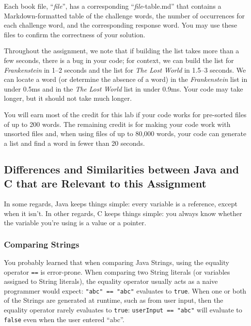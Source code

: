Each book file, ``\textit{file}'', has a corresponding ``\textit{file}-table.md'' that contains a Markdown-formatted table of the challenge words, the number of occurrences for each challenge word, and the corresponding response word.
You may use these files to confirm the correctness of your solution.

Throughout the assignment, we note that if building the list takes more than a few seconds, there is a bug in your code;
for context, we can build the list for \textit{Frankenstein} in 1--2 seconds and the list for \textit{The Lost World} in 1.5--3 seconds.
We can locate a word (or determine the absence of a word) in the \textit{Frankenstein} list in under 0.5ms and in the \textit{The Lost World} list in under 0.9ms.
Your code may take longer, but it should not take much longer.

You will earn most of the credit for this lab if your code works for pre-sorted files of up to 200 words.
The remaining credit is for making your code work with unsorted files and, when using files of up to 80,000 words, your code can generate a list and find a word in fewer than 20 seconds.

\subsection{Differences and Similarities between Java and C that are Relevant to this Assignment}

In some regards, Java keeps things simple: every variable is a reference, except when it isn't.
In other regards, C keeps things simple: you always know whether the variable you're using is a value or a pointer.

\subsubsection{Comparing Strings}

You probably learned that when comparing Java Strings, using the equality operator \lstinline{==} is error-prone.
When comparing two String literals (or variables assigned to String literals), the equality operator usually acts as a naive programmer would expect:
\lstinline{"abc" == "abc"} evaluates to \lstinline{true}.
When one or both of the Strings are generated at runtime, such as from user input, then the equality operator rarely evaluates to \lstinline{true}:
\lstinline{userInput == "abc"} will evaluate to \lstinline{false} even when the user entered ``abc''.

